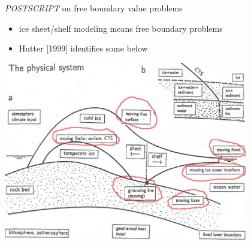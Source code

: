 

\begin{frame}{\emph{POSTSCRIPT} on free boundary value problems}

\begin{itemize}
\item ice sheet/shelf modeling means free boundary problems
\item Hutter [1999] identifies some below
\end{itemize}
\begin{center}
  \includegraphics[width=0.8\textwidth]{photos/freehutter}
\end{center}
\end{frame}


